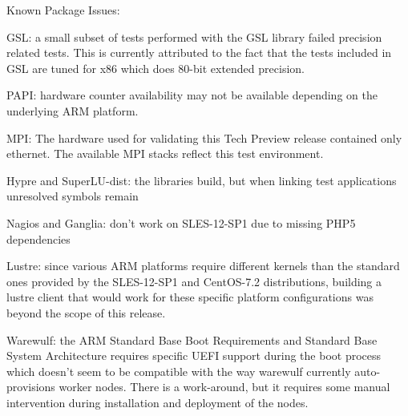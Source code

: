 \noindent Known Package Issues: 
\begin{itemize*}

\item GSL: a small subset of tests performed with the GSL library failed precision
related tests. This is currently attributed to the fact that the tests included
in GSL are tuned for x86 which does 80-bit extended precision.
\item PAPI: hardware counter availability may not be available depending on the
underlying ARM platform.
\item MPI: The hardware used for validating this Tech Preview release contained
only ethernet. The available MPI stacks reflect this test environment.
\item Hypre and SuperLU-dist: the libraries build, but when linking test
applications unresolved symbols remain
\item Nagios and Ganglia: don't work on SLES-12-SP1 due to missing PHP5
dependencies
\item Lustre: since various ARM platforms require different kernels than the
standard ones provided by the SLES-12-SP1 and CentOS-7.2 distributions, 
building a lustre client that would work for these specific platform 
configurations was beyond the scope of this release.
\item Warewulf: the ARM Standard Base Boot Requirements and Standard Base System
Architecture requires specific UEFI support during the boot process which
doesn't seem to be compatible with the way warewulf currently auto-provisions
worker nodes. There is a work-around, but it requires some manual intervention
during installation and deployment of the nodes.
\end{itemize*}

